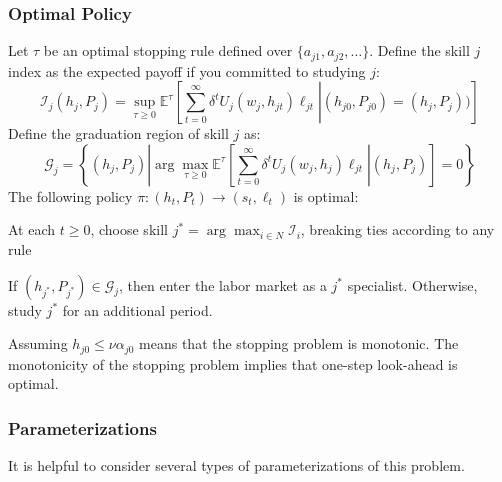 \documentclass[10 pt]{article}
\newcommand{\gen}[1]{#1}
\newcommand{\gen}[1]{}
\newcommand{\ce}[2]{\left[\left. #1 \right\vert #2 \right]}
\begin{document}
\subsubsection{Optimal Policy}

Let $\tau$ be an optimal stopping rule defined over $\{ a_{j1}, a_{j2}, \dots \}$. 
Define the skill $j$ index as the expected payoff if you committed to studying $j$:
\begin{equation}\label{idx}
\mathcal{I}_j (h_j, P_j) = \sup_{\tau \geq 0} \mathbb{E}^\tau
\ce{
   \sum_{t=0}^\infty \delta^t U_j (w_j, h_{jt}) \ell_{jt}}
   {(h_{j0}, P_{j0}) = (h_j, P_j))
}
\end{equation}
Define the graduation region of skill $j$ as: 
\begin{equation}\label{grad}
\mathcal{G}_j = \left\{ (h_j, P_j) \left\vert
   \arg \max_{\tau \geq 0} 
   \mathbb{E}^\tau \ce{\sum_{t=0}^\infty \delta^t U_j (w_j, h_j) \ell_{jt}}
   {(h_j, P_j)} = 0
   \right. \right\}
\end{equation}
The following policy $\pi: (h_t, P_t) \to (s_t, \ell_t)$ is optimal: 
\begin{outline}
	\item At each $t \geq 0$, choose skill $j^* = \arg \max_{i \in N} \mathcal{I}_i$, breaking ties according to any rule
	\item If $(h_{j^*}, P_{j^*}) \in \mathcal{G}_{j}$, then enter the labor market as a $j^*$ specialist. Otherwise, study $j^*$ for an additional period.  
\end{outline}
Assuming $h_{j0} \leq \nu \alpha_{j0}$ means that the stopping problem is monotonic.
The monotonicity of the stopping problem implies that one-step look-ahead is optimal.

\subsubsection{Parameterizations}

It is helpful to consider several types of parameterizations of this problem. 
\end{document}
